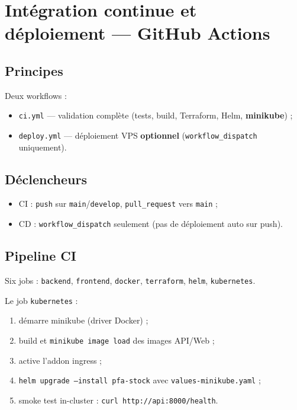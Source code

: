 \chapter{Intégration continue et déploiement — GitHub Actions}
\label{ch:cicd}

\section{Principes}

Deux workflows :
\begin{itemize}
  \item \texttt{ci.yml} — validation complète (tests, build, Terraform, Helm, \textbf{minikube}) ;
  \item \texttt{deploy.yml} — déploiement VPS \textbf{optionnel} (\texttt{workflow\_dispatch} uniquement).
\end{itemize}

\section{Déclencheurs}

\begin{itemize}
  \item CI : \texttt{push} sur \texttt{main}/\texttt{develop}, \texttt{pull\_request} vers \texttt{main} ;
  \item CD : \texttt{workflow\_dispatch} seulement (pas de déploiement auto sur push).
\end{itemize}

\section{Pipeline CI}

Six jobs : \texttt{backend}, \texttt{frontend}, \texttt{docker}, \texttt{terraform}, \texttt{helm}, \texttt{kubernetes}.

Le job \texttt{kubernetes} :
\begin{enumerate}
  \item démarre minikube (driver Docker) ;
  \item build et \texttt{minikube image load} des images API/Web ;
  \item active l'addon ingress ;
  \item \texttt{helm upgrade --install pfa-stock} avec \texttt{values-minikube.yaml} ;
  \item smoke test in-cluster : \texttt{curl http://api:8000/health}.
\end{enumerate}


